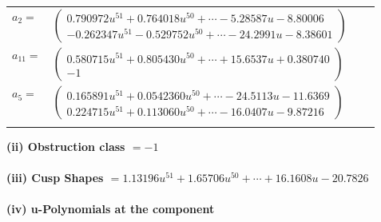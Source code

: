 \documentclass[1p]{elsarticle_modified}
\theoremstyle{definition}
\begin{document}
\begin{tabular}{m{7pt} m{180pt} m{7pt} m{180pt} }
\flushright $a_{2}=$&$\begin{pmatrix}0.790972 u^{51}+0.764018 u^{50}+\cdots-5.28587 u-8.80006\\-0.262347 u^{51}-0.529752 u^{50}+\cdots-24.2991 u-8.38601\end{pmatrix}$ \\
\flushright $a_{11}=$&$\begin{pmatrix}0.580715 u^{51}+0.805430 u^{50}+\cdots+15.6537 u+0.380740\\-1\end{pmatrix}$ \\
\flushright $a_{5}=$&$\begin{pmatrix}0.165891 u^{51}+0.0542360 u^{50}+\cdots-24.5113 u-11.6369\\0.224715 u^{51}+0.113060 u^{50}+\cdots-16.0407 u-9.87216\end{pmatrix}$\\&\end{tabular}
\flushleft \textbf{(ii) Obstruction class $= -1$}\\~\\
\flushleft \textbf{(iii) Cusp Shapes $= 1.13196 u^{51}+1.65706 u^{50}+\cdots+16.1608 u-20.7826$}\\~\\
\newpage\renewcommand{\arraystretch}{1}
\flushleft \textbf{(iv) u-Polynomials at the component}\newline \\
\end{document}
